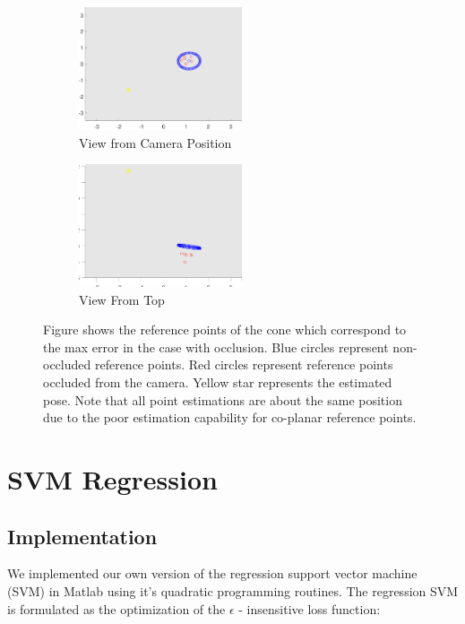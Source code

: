 \documentclass[journal]{IEEEtran}
\begin{document}
\begin{figure}
	\hspace{-10 ex}
	\begin{subfigure}{.3\textwidth}
		\centering
		\includegraphics[width=1.9in]{poor_cone_camera_view_w_error}
		\caption{View from Camera Position}
		\label{fig:vive}
	\end{subfigure}%
	\begin{subfigure}{.3\textwidth}
		\centering
		\includegraphics[width=1.9in]{poor_cone_topview_view_w_error}
		\caption{View From Top}
		\label{fig:oculus}
	\end{subfigure}
	\caption{Figure shows the reference points of the cone which correspond to the max error in the case with occlusion. Blue circles represent non-occluded reference points. Red circles represent reference points occluded from the camera. Yellow star represents the estimated pose. Note that all point estimations are about the same position due to the poor estimation capability for co-planar reference points.}
	\label{Fig:cone_performance}
\end{figure}


\section{SVM Regression}

\subsection{Implementation}
We implemented our own version of the regression support vector machine (SVM) in Matlab using it's quadratic programming routines. The regression SVM is formulated as the optimization of the $\epsilon$ - insensitive loss function:
\end{document}
